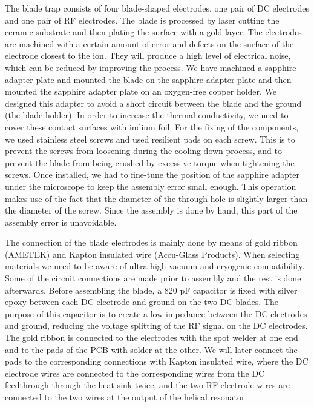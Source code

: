 The blade trap consists of four blade-shaped electrodes, one pair of DC electrodes and one pair of RF electrodes. The blade is processed by laser cutting the ceramic substrate and then plating the surface with a gold layer. The electrodes are machined with a certain amount of error and defects on the surface of the electrode closest to the ion. They will produce a high level of electrical noise, which can be reduced by improving the process. We have machined a sapphire adapter plate and mounted the blade on the sapphire adapter plate and then mounted the sapphire adapter plate on an oxygen-free copper holder. We designed this adapter to avoid a short circuit between the blade and the ground (the blade holder). In order to increase the thermal conductivity, we need to cover these contact surfaces with indium foil. For the fixing of the components, we used stainless steel screws and used resilient pads on each screw. This is to prevent the screws from loosening during the cooling down process, and to prevent the blade from being crushed by excessive torque when tightening the screws. Once installed, we had to fine-tune the position of the sapphire adapter under the microscope to keep the assembly error small enough. This operation makes use of the fact that the diameter of the through-hole is slightly larger than the diameter of the screw. Since the assembly is done by hand, this part of the assembly error is unavoidable.

The connection of the blade electrodes is mainly done by means of gold ribbon (AMETEK) and Kapton insulated wire (Accu-Glass Products). When selecting materials we need to be aware of ultra-high vacuum and cryogenic compatibility. Some of the circuit connections are made prior to assembly and the rest is done afterwards. Before assembling the blade, a 820 pF capacitor is fixed with silver epoxy between each DC electrode and ground on the two DC blades. The purpose of this capacitor is to create a low impedance between the DC electrodes and ground, reducing the voltage splitting of the RF signal on the DC electrodes. The gold ribbon is connected to the electrodes with the spot welder at one end and to the pads of the PCB with solder at the other. We will later connect the pads to the corresponding connections with Kapton insulated wire, where the DC electrode wires are connected to the corresponding wires from the DC feedthrough through the heat sink twice, and the two RF electrode wires are connected to the two wires at the output of the helical resonator.



